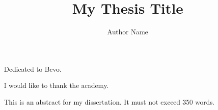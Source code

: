 \documentclass[12pt]{report}	%
\author{Author Name}  	%
\title{My Thesis Title}
\theoremstyle{definition}
\theoremstyle{remark}
\begin{document}
\copyrightpage          %

%
%
%
\commcertpage           %

\titlepage              %


%
\begin{dedication}
Dedicated to Bevo.
\end{dedication}


\begin{acknowledgments}		%
I would like to thank the academy.

\end{acknowledgments}


%
\utabstract
\indent
This is an abstract for my dissertation.  It must not exceed 350 words. 

\tableofcontents   %

\listoftables      %
\listoffigures     %


%
%
\end{document}
